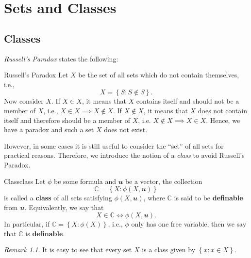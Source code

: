\documentclass[math]{amznotes}
\theoremstyle{remark}
\newtheorem*{remark}{Remark}
\begin{document}
\tableofcontents

\chapter{Sets and Classes}
\section{Classes}
\textit{Russell's Paradox} states the following:
\begin{genbox}{Russell's Paradox}
    Let $X$ be the set of all sets which do not contain themselves, i.e.,
    \begin{equation*}
        X = \left\{S \colon S \notin S\right\}.
    \end{equation*}
    Now consider $X$. If $X \in X$, it means that $X$ contains itself and should not be a member of $X$, i.e., $X \in X \implies X \notin X$. If $X \notin X$, it means that $X$ does not contain itself and therefore should be a member of $X$, i.e. $X \notin X \implies X \in X$. Hence, we have a paradox and such a set $X$ does not exist.
\end{genbox}
However, in some cases it is still useful to consider the ``set'' of all sets for practical reasons. Therefore, we introduce the notion of a \textit{class} to avoid Russell's Paradox. 
\begin{dfnbox}{Class}{class}
    Let $\phi$ be some formula and $\mathbfit{u}$ be a vector, the collection
    \begin{displaymath}
        \mathbb{C} = \left\{X \colon \phi(X, \mathbfit{u})\right\}
    \end{displaymath}
    is called a {\color{red} \textbf{class}} of all sets satisfying $\phi(X, \mathbfit{u})$, where $\mathbb{C}$ is said to be {\color{red} \textbf{definable}} from $\mathbfit{u}$. Equivalently, we say that
    \begin{displaymath}
        X \in \mathbb{C} \iff \phi(X, \mathbfit{u}).
    \end{displaymath}
    In particular, if $\mathbb{C} = \left\{X \colon \phi(X)\right\}$, i.e., $\phi$ only has one free variable, then we say that $\mathbb{C}$ is {\color{red} \textbf{definable}}.
\end{dfnbox}
\begin{notebox}
    \begin{remark}
        It is easy to see that every set $X$ is a class given by $\left\{x \colon x \in X\right\}$.
    \end{remark}
\end{notebox}
\end{document}
